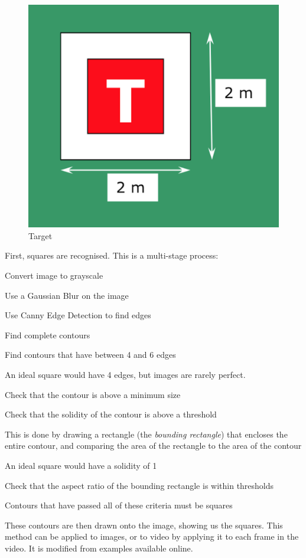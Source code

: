 \documentclass[11pt]{article}
\begin{document}
\begin{figure}
    \begin{center}
        \includegraphics[width=0.48\linewidth]{IMechE_target}
        \caption{Target}
        \label{fig:target}
    \end{center}
\end{figure}

First, squares are recognised. This is a multi-stage process:
\begin{compactenum}
    \item Convert image to grayscale
    \item Use a Gaussian Blur on the image
    \item Use Canny Edge Detection to find edges
    \item Find complete contours
    \item Find contours that have between 4 and 6 edges
    \begin{compactitem}
        \item An ideal square would have 4 edges, but images are rarely perfect.
    \end{compactitem}
    \item Check that the contour is above a minimum size
    \item Check that the solidity of the contour is above a threshold
    \begin{compactitem}
        \item This is done by drawing a rectangle (the \emph{bounding rectangle}) that encloses the entire contour, and comparing the area of the rectangle to the area of the contour
        \item An ideal square would have a solidity of 1
    \end{compactitem}
    \item Check that the aspect ratio of the bounding rectangle is within thresholds
    \item Contours that have passed all of these criteria must be squares
\end{compactenum}
These contours are then drawn onto the image, showing us the squares. This method can be applied to images, or to video by applying it to each frame in the video. It is modified from examples available online\cite{opencv_tutorials}\cite{pyimagesearch_squares}.
\end{document}
